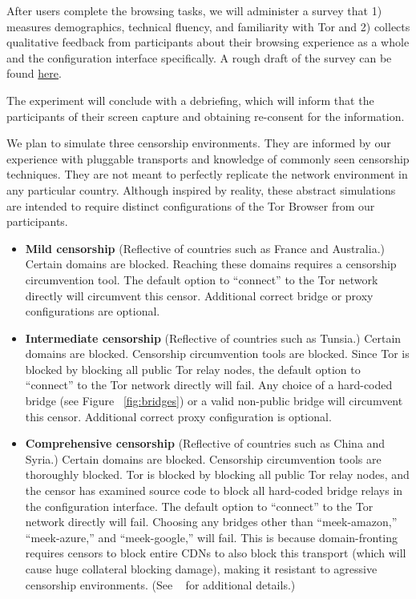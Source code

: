 \documentclass{template}
\begin{document}
After users complete the browsing tasks, we will administer a survey that 1)
measures demographics, technical fluency, and
familiarity with Tor and 2) collects qualitative feedback from
participants about their browsing experience as a whole
and the configuration interface specifically.
A rough draft of the survey can be
found
\href{http://www.surveygizmo.com/collab/2085559/Tor-Usability-Survey}{here}.

The experiment will conclude with a debriefing, which will inform that the
participants of their screen capture and obtaining re-consent for the
information. 

We plan to simulate three censorship environments.
They are informed by our experience with pluggable transports
and knowledge of commonly seen censorship techniques.
They are not meant to perfectly replicate the network environment
in any particular country. Although inspired by reality, these
abstract simulations are intended to require distinct configurations
of the Tor Browser from our participants. 

\begin{itemize} \itemsep1pt \parskip0pt 
\item {\bfseries Mild censorship} 
(Reflective of countries such as France and Australia.)
Certain domains are blocked. Reaching these 
domains requires a censorship circumvention 
tool. The default option to ``connect'' to the Tor network 
directly will circumvent this censor. Additional correct
bridge or proxy configurations are optional. 
\item {\bfseries Intermediate censorship} 
(Reflective of countries such as Tunsia.)
Certain domains are blocked. Censorship circumvention
tools are blocked. Since Tor is blocked by blocking all public Tor
relay nodes, the default option to ``connect'' to the Tor network
directly will fail. Any choice of a hard-coded bridge (see Figure ~\ref{fig:bridges})
or a valid non-public bridge will circumvent this censor.  
Additional correct proxy configuration is optional.
\item {\bfseries Comprehensive censorship} 
(Reflective of countries such as China and Syria.)
Certain domains are blocked. Censorship circumvention tools
are thoroughly blocked. Tor is blocked by blocking all public
Tor relay nodes, and the censor has examined source code to block
all hard-coded bridge relays in the configuration interface. The default option
to ``connect'' to the Tor network directly will fail. Choosing any bridges other than
``meek-amazon,'' ``meek-azure,'' and ``meek-google,'' will fail. This is because 
domain-fronting requires censors to block entire CDNs to also block this
transport (which will cause huge collateral blocking damage), making it resistant to agressive censorship environments.
(See ~\cite{fifield2015blocking} for additional details.)\\
\end{itemize}
\end{document}
